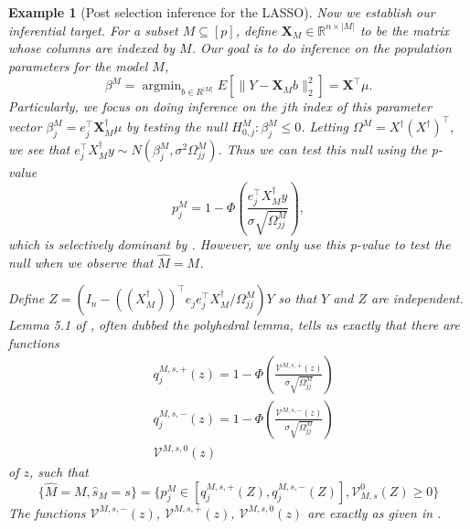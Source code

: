 \documentclass{article}
\DeclareMathOperator*{\argmin}{argmin}
\newtheorem{example}{Example}
\newcommand{\R}{\mathbb{R}}
\newcommand{\X}{\boldsymbol{X}}
\begin{document}
\begin{appendix}
\begin{example}[Post selection inference for the LASSO]
    
    Now we establish our inferential target. For a subset $M \subseteq [p]$, define $\X_M \in \R^{n \times |M|}$ to be the matrix whose columns are indexed by $M$. Our goal is to do inference on the population parameters for the model $M$,
    \begin{equation*}
        \beta^M = \argmin_{b \in R^{|M|}} E[ \|Y - \X_M b \|^2_2] = \X^{\top} \mu.
    \end{equation*}
    Particularly, we focus on doing inference on the $j$th index of this parameter vector $\beta^M_j = e_j^{\top} \X_M^{\dagger} \mu$ by testing the null $H_{0, j}^M: \beta^M_j \leq 0$. Letting $\Omega^M = X^{\dagger} (X^{\dagger})^{\top}$, we see that $e_j^{\top}X_M^{\dagger} y \sim N(\beta_j^M, \sigma^2 \Omega^M_{jj} )$. Thus we can test this null using the p-value 
    \begin{equation*}
        p^M_j = 1 - \Phi\left( \frac{e_j^{\top}X_M^{\dagger} y}{\sigma \sqrt{\Omega^M_{jj}}}\right),
    \end{equation*}
    which is selectively dominant by . However, we only use this p-value to test the null when we observe that $\hat{M} = M$. 
    
    Define $Z = (I_n - ((X_M^{\dagger}))^{\top}e_je_j^{\top} X_M^{\dagger}/\Omega^M_{jj}) Y  $ so that $Y$ and $Z$ are independent. Lemma 5.1 of \cite{Lee2016}, often dubbed the polyhedral lemma, tells us exactly that there are functions 
    \begin{align*}
        &q_j^{M, s, +}(z) = 1 - \Phi\left( \frac{\mathcal{V}^{M, s, +}(z)}{\sigma \sqrt{\Omega^M_{jj}}}\right) \\
        &q_j^{M, s, -}(z) = 1 - \Phi\left( \frac{\mathcal{V}^{M, s, -}(z)}{\sigma \sqrt{\Omega^M_{jj}}}\right) \\
        &\mathcal{V}^{M, s, 0}(z)
    \end{align*}
    of $z$, such that 
    \begin{equation*}
        \{\hat{M} = M, \hat{s}_M = s \} = \{ p^{M}_j \in [q_j^{M, s, +}(Z), q_j^{M, s, -}(Z)],   \mathcal{V}_{M, s}^0(Z)\geq 0\} 
    \end{equation*}
    The functions $\mathcal{V}^{M, s, -}(z)$, $\mathcal{V}^{M, s, +}(z)$, $\mathcal{V}^{M, s, 0}(z)$ are exactly as given in \cite{Lee2016}. 


\end{example}
\end{appendix}
\end{document}
